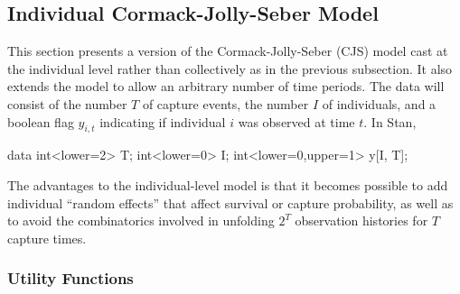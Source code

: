 \subsection{Individual Cormack-Jolly-Seber Model}

This section presents a version of the Cormack-Jolly-Seber (CJS) model
cast at the individual level rather than collectively as in the
previous subsection.  It also extends the model to allow an arbitrary
number of time periods.  The data will consist of the number $T$ of
capture events, the number $I$ of individuals, and a boolean flag
$y_{i,t}$ indicating if individual $i$ was observed at time $t$.  In
Stan,
%
\begin{stancode}
data {
  int<lower=2> T;
  int<lower=0> I;
  int<lower=0,upper=1> y[I, T];
}
\end{stancode}

The advantages to the individual-level model is that it becomes
possible to add individual ``random effects'' that affect survival or
capture probability, as well as to avoid the combinatorics involved in
unfolding $2^T$ observation histories for $T$ capture times.

\subsubsection{Utility Functions}

